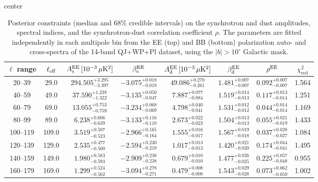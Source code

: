 \begin{table}[h]
\centering
\setlength{\tabcolsep}{4pt}
\caption{Posterior constraints (median and $68\%$ credible intervals) on the synchrotron and dust amplitudes, spectral indices, and the synchrotron-dust correlation coefficient $\rho$. The parameters are fitted independently in each multipole bin from the EE (top) and BB (bottom) polarization auto- and cross-spectra of the 14-band QJ+WP+Pl dataset, using the $|b|>10^\circ$ Galactic mask.}
\label{tab:bin_to_bin_galcut10_all_pairs}
\begin{adjustbox}{center}
\begin{tabular}{cccccccc}
\toprule
$\ell$ range & $\ell_{\rm eff}$ & $A^{\rm EE}_{\rm s}\,[10^{-3}\,\mu\mathrm{K}^2]$ & $\beta^{\rm EE}_{\rm s}$ & $A^{\rm EE}_{\rm d}\,[10^{-3}\,\mu\mathrm{K}^2]$ & $\beta^{\rm EE}_{\rm d}$ & $\rho^{\rm EE}$ & $\chi^2_\mathrm{red}$ \\
\midrule
20--39 & 29.0 & $294.505^{+3.295}_{-3.397}$ & $-3.075^{+0.018}_{-0.018}$ & $49.086^{+0.270}_{-0.261}$ & $1.481^{+0.007}_{-0.007}$ & $0.092^{+0.007}_{-0.007}$ & 1.564 \\
40--59 & 49.0 & $37.590^{+1.238}_{-1.322}$ & $-3.135^{+0.050}_{-0.047}$ & $7.887^{+0.077}_{-0.084}$ & $1.519^{+0.014}_{-0.013}$ & $0.117^{+0.013}_{-0.014}$ & 1.251 \\
60--79 & 69.0 & $13.055^{+0.753}_{-0.759}$ & $-3.234^{+0.068}_{-0.069}$ & $4.798^{+0.040}_{-0.041}$ & $1.531^{+0.012}_{-0.012}$ & $0.044^{+0.014}_{-0.014}$ & 1.169 \\
80--99 & 89.0 & $6.238^{+0.606}_{-0.639}$ & $-3.133^{+0.116}_{-0.110}$ & $2.673^{+0.022}_{-0.023}$ & $1.504^{+0.013}_{-0.013}$ & $0.055^{+0.021}_{-0.019}$ & 1.433 \\
100--119 & 109.0 & $3.519^{+0.507}_{-0.523}$ & $-2.966^{+0.165}_{-0.164}$ & $1.555^{+0.016}_{-0.017}$ & $1.567^{+0.019}_{-0.018}$ & $0.037^{+0.028}_{-0.027}$ & 1.084 \\
120--139 & 129.0 & $2.535^{+0.477}_{-0.500}$ & $-2.594^{+0.230}_{-0.219}$ & $1.017^{+0.013}_{-0.013}$ & $1.420^{+0.021}_{-0.020}$ & $0.174^{+0.044}_{-0.041}$ & 1.495 \\
140--159 & 149.0 & $1.980^{+0.583}_{-0.593}$ & $-2.909^{+0.238}_{-0.238}$ & $0.679^{+0.010}_{-0.010}$ & $1.477^{+0.026}_{-0.025}$ & $0.225^{+0.057}_{-0.048}$ & 0.955 \\
160--179 & 169.0 & $1.299^{+0.524}_{-0.502}$ & $-3.094^{+0.278}_{-0.271}$ & $0.479^{+0.008}_{-0.008}$ & $1.543^{+0.029}_{-0.028}$ & $0.073^{+0.062}_{-0.059}$ & 1.002 \\

\end{tabular}
\end{adjustbox}
\end{table}
